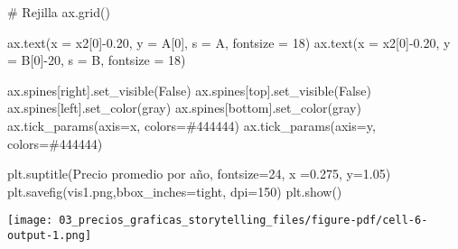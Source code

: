 \documentclass[
  letterpaper,
  DIV=11,
  numbers=noendperiod]{scrreprt}
\newenvironment{Shaded}{\begin{snugshade}}{\end{snugshade}}
\newcommand{\CommentTok}[1]{\textcolor[rgb]{0.37,0.37,0.37}{#1}}
\newcommand{\DecValTok}[1]{\textcolor[rgb]{0.68,0.00,0.00}{#1}}
\newcommand{\FloatTok}[1]{\textcolor[rgb]{0.68,0.00,0.00}{#1}}
\newcommand{\NormalTok}[1]{\textcolor[rgb]{0.00,0.23,0.31}{#1}}
\newcommand{\OperatorTok}[1]{\textcolor[rgb]{0.37,0.37,0.37}{#1}}
\newcommand{\StringTok}[1]{\textcolor[rgb]{0.13,0.47,0.30}{#1}}
\newcommand{\VariableTok}[1]{\textcolor[rgb]{0.07,0.07,0.07}{#1}}
\begin{document}
\begin{Shaded}
\begin{Highlighting}[]
\CommentTok{\# Rejilla}
\NormalTok{ax.grid()}

\NormalTok{ax.text(x }\OperatorTok{=}\NormalTok{ x2[}\DecValTok{0}\NormalTok{]}\OperatorTok{{-}}\FloatTok{0.20}\NormalTok{, y }\OperatorTok{=}\NormalTok{ A[}\DecValTok{0}\NormalTok{], s }\OperatorTok{=} \StringTok{\textquotesingle{}A\textquotesingle{}}\NormalTok{, fontsize }\OperatorTok{=} \DecValTok{18}\NormalTok{)}
\NormalTok{ax.text(x }\OperatorTok{=}\NormalTok{ x2[}\DecValTok{0}\NormalTok{]}\OperatorTok{{-}}\FloatTok{0.20}\NormalTok{, y }\OperatorTok{=}\NormalTok{ B[}\DecValTok{0}\NormalTok{]}\OperatorTok{{-}}\DecValTok{20}\NormalTok{, s }\OperatorTok{=} \StringTok{\textquotesingle{}B\textquotesingle{}}\NormalTok{, fontsize }\OperatorTok{=} \DecValTok{18}\NormalTok{)}

\NormalTok{ax.spines[}\StringTok{\textquotesingle{}right\textquotesingle{}}\NormalTok{].set\_visible(}\VariableTok{False}\NormalTok{)}
\NormalTok{ax.spines[}\StringTok{\textquotesingle{}top\textquotesingle{}}\NormalTok{].set\_visible(}\VariableTok{False}\NormalTok{)}
\NormalTok{ax.spines[}\StringTok{\textquotesingle{}left\textquotesingle{}}\NormalTok{].set\_color(}\StringTok{\textquotesingle{}gray\textquotesingle{}}\NormalTok{)}
\NormalTok{ax.spines[}\StringTok{\textquotesingle{}bottom\textquotesingle{}}\NormalTok{].set\_color(}\StringTok{\textquotesingle{}gray\textquotesingle{}}\NormalTok{)}
\NormalTok{ax.tick\_params(axis}\OperatorTok{=}\StringTok{\textquotesingle{}x\textquotesingle{}}\NormalTok{, colors}\OperatorTok{=}\StringTok{\textquotesingle{}\#444444\textquotesingle{}}\NormalTok{)}
\NormalTok{ax.tick\_params(axis}\OperatorTok{=}\StringTok{\textquotesingle{}y\textquotesingle{}}\NormalTok{, colors}\OperatorTok{=}\StringTok{\textquotesingle{}\#444444\textquotesingle{}}\NormalTok{)}

\NormalTok{plt.suptitle(}\StringTok{\textquotesingle{}Precio promedio por año\textquotesingle{}}\NormalTok{, fontsize}\OperatorTok{=}\DecValTok{24}\NormalTok{, x }\OperatorTok{=}\FloatTok{0.275}\NormalTok{, y}\OperatorTok{=}\FloatTok{1.05}\NormalTok{)}
\NormalTok{plt.savefig(}\StringTok{\textquotesingle{}vis1.png\textquotesingle{}}\NormalTok{,bbox\_inches}\OperatorTok{=}\StringTok{\textquotesingle{}tight\textquotesingle{}}\NormalTok{, dpi}\OperatorTok{=}\DecValTok{150}\NormalTok{)}
\NormalTok{plt.show()}
\end{Highlighting}
\end{Shaded}

\texttt{[image: 03\_precios\_graficas\_storytelling\_files/figure-pdf/cell-6-output-1.png]}
\end{document}
